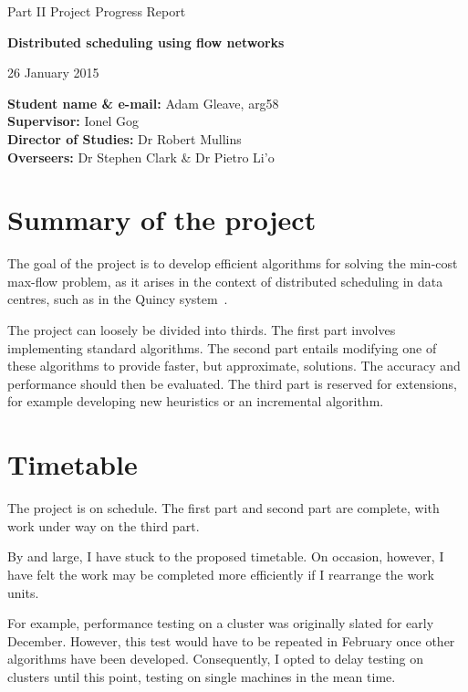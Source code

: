 
\centerline{\Large Part II Project Progress Report}
\vspace{0.1in}
\centerline{\large \textbf{Distributed scheduling using flow networks}}
\vspace{0.1in}
\centerline{26 January 2015}


\textbf{Student name \& e-mail:} Adam Gleave, arg58 \hfil \\
\textbf{Supervisor:} Ionel Gog \hfil \\
\textbf{Director of Studies:} Dr Robert Mullins \hfil \\
\textbf{Overseers:} Dr Stephen Clark \& Dr Pietro Li\a'o \hfil \\


\section{Summary of the project}
The goal of the project is to develop efficient algorithms for solving the min-cost max-flow problem, as it arises in the context of distributed scheduling in data centres, such as in the Quincy system~\cite{Isard:2009}. 

The project can loosely be divided into thirds. The first part involves implementing standard algorithms. The second part entails modifying one of these algorithms to provide faster, but approximate, solutions. The accuracy and performance should then be evaluated. The third part is reserved for extensions, for example developing new heuristics or an incremental algorithm.

\section{Timetable}
The project is on schedule. The first part and second part are complete, with work under way on the third part. 

By and large, I have stuck to the proposed timetable. On occasion, however, I have felt the work may be completed more efficiently if I rearrange the work units. 

For example, performance testing on a cluster was originally slated for early December. However, this test would have to be repeated in February once other algorithms have been developed. Consequently, I opted to delay testing on clusters until this point, testing on single machines in the mean time.

